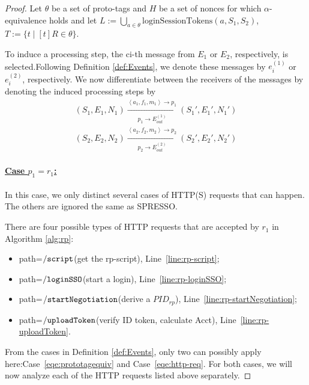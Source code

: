   \begin{proof}
    Let $\theta$ be a set of proto-tags and $H$ be a set of 
    nonces for which $\alpha$-equivalence holds and let 
    $L:=\bigcup_{a\in\theta}\text{loginSessionTokens}(a,S_1,S_2)$,
    $T:=\{t\mid [t]R\in \theta\}$.
    
    To induce a processing step, the ci-th message from $E_1$ or 
    $E_2$, respectively, is selected.Following Definition 
    \ref{def:Events}, we denote these messages by $e_i^{(1)}$ or 
    $e_i^{(2)}$, respectively. We now differentiate between the 
    receivers of the messages by denoting the induced processing 
    steps by
    \begin{equation}
      \begin{aligned}
        (S_1,E_1,N_1)\xrightarrow[p_1\rightarrow E_{out}^{(1)}]{\left \langle a_1,f_1,m_1\right \rangle\rightarrow p_1}(S_1\prime,E_1\prime,N_1\prime)\\
        (S_2,E_2,N_2)\xrightarrow[p_2\rightarrow E_{out}^{(2)}]{\left \langle a_2,f_2,m_2\right \rangle\rightarrow p_2}(S_2\prime,E_2\prime,N_2\prime)
      \end{aligned}
    \end{equation}
    \paragraph{\underline{Case $p_1=r_1$:}}
    In this case, we only distinct several cases of HTTP(S) requests that can happen. The others are ignored the same as SPRESSO.\par
    There are four possible types of HTTP requests that are accepted by $r_1$ in Algorithm \ref{alg:rp}:
    \begin{itemize}
      \item path=$\mathtt{/script}$(get the rp-script), Line~\ref{line:rp-script};
      \item path=$\mathtt{/loginSSO}$(start a login), Line~\ref{line:rp-loginSSO};
      \item path=$\mathtt{/startNegotiation}$(derive a $PID_{rp}$), Line~\ref{line:rp-startNegotiation};
      \item path=$\mathtt{/uploadToken}$(verify ID token, calculate Acct), Line~\ref{line:rp-uploadToken}.
    \end{itemize}
    \par From the cases in Definition \ref{def:Events}, only two 
    can possibly apply here:Case~\ref{eqe:prototagequiv} and 
    Case~\ref{eqe:http-req}. For both cases, we will now analyze 
    each of the HTTP requests listed above separately.
  

\end{proof}

